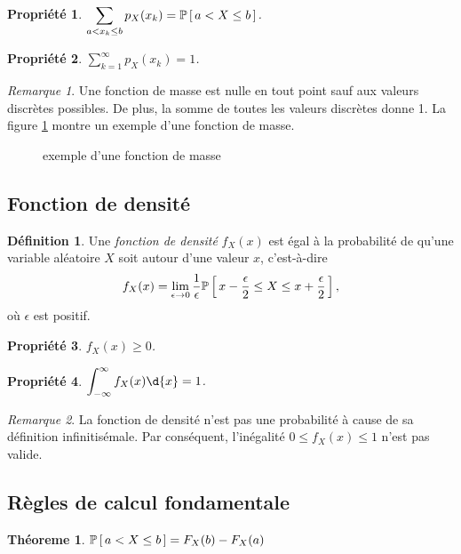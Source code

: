 \documentclass[11pt]{article}
\makeatletter
\renewcommand\P[1]{%
	\ensuremath{%
		\mathbb{P}\left[\,#1\,\right]%
	}%
}%
\newtheorem{theoreme}{Théoreme}[section]
\newtheorem{property}{Propriété}
\theoremstyle{remark}
\newtheorem*{remark}{Remarque}
\theoremstyle{definition}
\newtheorem*{@definition}{Définition}
\newenvironment{definition}{%
	\begin{@definition}%
}{%
	\end{@definition}%
	\setcounter{property}{0}%
}
\makeatother
\begin{document}
\begin{property}
	$\displaystyle\sum_{a< x_k\leq b}p_X(x_k)=\P{a<X\leq b}$.
\end{property}\vspace{-6mm}

\begin{property}
	$\displaystyle\sum_{k=1}^\infty p_X(x_k)=1$.
\end{property}

\begin{remark}
	Une fonction de masse est nulle en tout point sauf aux valeurs discrètes
	possibles. De plus, la somme de toutes les valeurs discrètes donne 1. La
	figure \ref{fig:fonction_masse} montre un exemple d'une fonction de masse.
\end{remark}

\begin{figure}[H]
	\centering
	\caption{exemple d'une fonction de masse}
	
	\label{fig:fonction_masse}
\end{figure}

\subsection{Fonction de densité}
\begin{definition}
	Une \textit{fonction de densité} $f_X(x)$ est égal à la probabilité de
	qu'une variable aléatoire $X$ soit autour d'une valeur $x$, c'est-à-dire
	\begin{equation*}
		f_X(x)=\lim_{\epsilon\rightarrow 0}\frac{1}{\epsilon}
		\P{x-\frac{\epsilon}{2}\leq X\leq x+\frac{\epsilon}{2}},
	\end{equation*}
	où $\epsilon$ est positif.
\end{definition}

\begin{property}
	$f_X(x)\geq 0$.
\end{property}

\begin{property}
	$\displaystyle\int_{-\infty}^\infty f_X(x)\d{x}=1$.
\end{property}

\begin{remark}
	La fonction de densité n'est pas une probabilité à cause de sa définition
	infinitisémale. Par conséquent, l'inégalité  $0\leq f_X(x)\leq 1$ n'est
	pas valide.
\end{remark}

\subsection{Règles de calcul fondamentale}
\begin{theoreme}\label{th:calc_fond}
	$\P{a<X\leq b}=F_X(b)-F_X(a)$
\end{theoreme}
\end{document}
